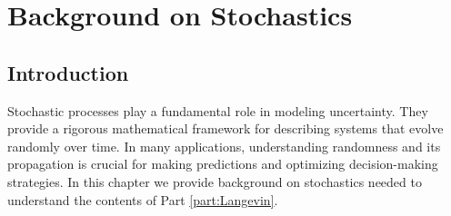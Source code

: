 \documentclass[11pt, twoside]{report}
\begin{document}

\chapter{Background on Stochastics}

\section{Introduction}
Stochastic processes play a fundamental role in modeling uncertainty. They provide a rigorous mathematical framework for describing systems that evolve randomly over time. In many applications, understanding randomness and its propagation is crucial for making predictions and optimizing decision-making strategies. In this chapter we provide background on stochastics needed to understand the contents of Part \ref{part:Langevin}.
\end{document}
